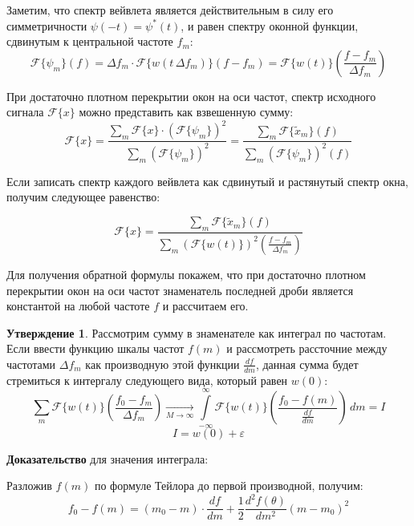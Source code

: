 Заметим, что спектр вейвлета является действительным в силу его симметричности $\psi(-t) = \psi^{*}(t)$, и равен спектру оконной функции, сдвинутым к центральной частоте $f_m$:
\begin{equation}
  \mathcal{F}\{\psi_m\}(f) = \Delta f_m \cdot \mathcal{F}\{w(t\,\Delta f_m)\}(f - f_m) = \mathcal{F}\{w(t)\}\left(\frac{f - f_m}{\Delta f_m}\right)
\end{equation}

При достаточно плотном перекрытии окон на оси частот, спектр исходного сигнала $\mathcal{F}\{x\}$ можно представить как взвешенную сумму:
\begin{equation}
  \mathcal{F}\{x\} = \frac{
    \sum \limits_m \mathcal{F}\{x\} \cdot (\mathcal{F}\{\psi_m\})^2
  }{
    \sum \limits_m (\mathcal{F}\{\psi_m\})^2
  } = 
  \frac{
    \sum \limits_m \mathcal{F}\{\tilde{x}_m\}(f)
  }{
    \sum \limits_m (\mathcal{F}\{\psi_m\})^2(f)
  }
  \label{eq:back_weighted_sum}
\end{equation}

Если записать спектр каждого вейвлета как сдвинутый и растянутый спектр окна, получим следующее равенство:

\begin{equation}
  \mathcal{F}\{x\} = 
  \frac{
    \sum \limits_m \mathcal{F}\{\tilde{x}_m\}(f)
  }{
    \sum \limits_m (\mathcal{F}\{w(t)\})^2 \left(\frac{f - f_m}{\Delta f_m}\right)
  }
  \label{eq:wavelets_back_spec}
\end{equation}


Для получения обратной формулы покажем, что при достаточно плотном перекрытии окон на оси частот
знаменатель последней дроби является константой на любой частоте $f$ и рассчитаем его.

\textbf{Утверждение 1}. Рассмотрим сумму в знаменателе как интеграл по частотам.
Если ввести функцию шкалы частот $f(m)$ и рассмотреть рассточние между частотами $\Delta f_m$ как производную этой функции $\frac{df}{dm}$,
данная сумма будет стремиться к интергалу следующего вида, который равен $w(0)$:
\begin{equation}
\sum \limits_m \mathcal{F}\{w(t)\} \left(\frac{f_0 - f_m}{\Delta f_m}\right) 
  \xrightarrow[M \to \infty]{} 
\int \limits_{-\infty}^\infty \mathcal{F}\{w(t)\} \left(\frac{f_0 - f(m)}{\frac{df}{dm}}\right) \, dm
  = I
\end{equation}
\[
I = w(0) + \varepsilon
\]

\textbf{Доказательство} для значения интеграла:

Разложив $f(m)$ по формуле Тейлора до первой производной, получим:
\begin{equation}
  f_0 - f(m) = (m_0 - m) \cdot \frac{df}{dm} + \frac{1}{2} \frac{d^2f(\theta)}{dm^2} (m - m_0)^2
\end{equation}

